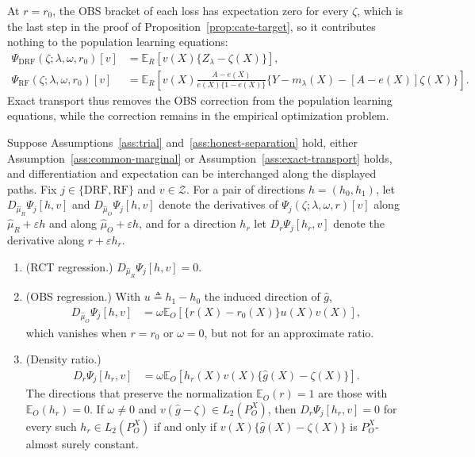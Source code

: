 At $r=r_0$, the OBS bracket of each loss has expectation zero for every $\zeta$, which is the last step in the proof of Proposition~\ref{prop:cate-target}, so it contributes nothing to the population learning equations:
\begin{align*}
\Psi_{\mathrm{DRF}}(\zeta;\lambda,\omega,r_0)[v]
&=\mathbb E_R[v(X)\{Z_\lambda-\zeta(X)\}],
\\
\Psi_{\mathrm{RF}}(\zeta;\lambda,\omega,r_0)[v]
&=\mathbb E_R\left[v(X)\frac{A-e(X)}{e(X)\{1-e(X)\}}\{Y-m_\lambda(X)-[A-e(X)]\zeta(X)\}\right].
\end{align*}
Exact transport thus removes the OBS correction from the population learning equations, while the correction remains in the empirical optimization problem.

\begin{proposition}
\label{prop:cate-orthogonality-audit}
Suppose Assumptions~\ref{ass:trial} and~\ref{ass:honest-separation} hold, either Assumption~\ref{ass:common-marginal} or Assumption~\ref{ass:exact-transport} holds, and differentiation and expectation can be interchanged along the displayed paths. Fix $j\in\{\mathrm{DRF},\mathrm{RF}\}$ and $v\in\mathcal Z$. For a pair of directions $h=(h_0,h_1)$, let $D_{\widehat\mu_R}\Psi_j[h,v]$ and $D_{\widehat\mu_O}\Psi_j[h,v]$ denote the derivatives of $\Psi_j(\zeta;\lambda,\omega,r)[v]$ along $\widehat\mu_R+\varepsilon h$ and along $\widehat\mu_O+\varepsilon h$, and for a direction $h_r$ let $D_r\Psi_j[h_r,v]$ denote the derivative along $r+\varepsilon h_r$.
\begin{enumerate}
\item (RCT regression.) $D_{\widehat\mu_R}\Psi_j[h,v]=0$.
\item (OBS regression.) With $u\triangleq h_1-h_0$ the induced direction of $\widehat g$,
\begin{align}
D_{\widehat\mu_O}\Psi_j[h,v]
&=\omega\mathbb E_O[\{r(X)-r_0(X)\}u(X)v(X)],
\label{eq:cate-g-score-derivative}
\end{align}
which vanishes when $r=r_0$ or $\omega=0$, but not for an approximate ratio.
\item (Density ratio.)
\begin{align}
D_r\Psi_j[h_r,v]
&=\omega\mathbb E_O[h_r(X)v(X)\{\widehat g(X)-\zeta(X)\}].
\label{eq:cate-ratio-score-derivative}
\end{align}
The directions that preserve the normalization $\mathbb E_O(r)=1$ are those with $\mathbb E_O(h_r)=0$. If $\omega\neq0$ and $v(\widehat g-\zeta)\in L_2(P_O^X)$, then $D_r\Psi_j[h_r,v]=0$ for every such $h_r\in L_2(P_O^X)$ if and only if $v(X)\{\widehat g(X)-\zeta(X)\}$ is $P_O^X$-almost surely constant.
\end{enumerate}
\end{proposition}

